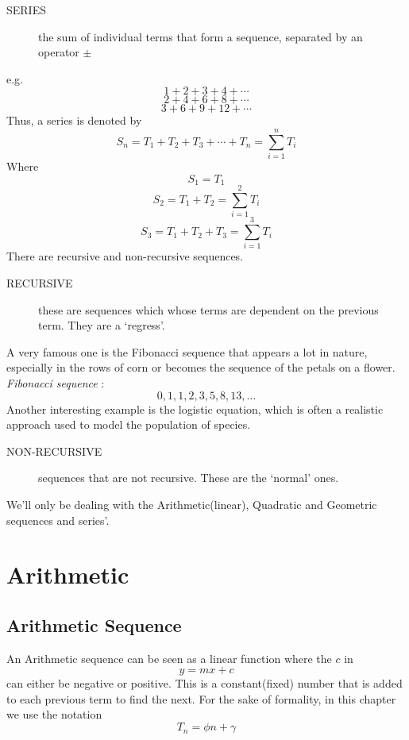 \documentclass[
  letterpaper,
  DIV=11,
  numbers=noendperiod]{scrreprt}
\begin{document}
\begin{description}
\item[SERIES]
the sum of individual terms that form a sequence, separated by an
operator \(\pm\)
\end{description}

e.g.~\[1 + 2 +3+4+⋯ \] \[2 +4+6+8+⋯ \] \[3 +6+9+12+⋯ \] Thus, a series
is denoted by \[
S_n = 𝑇_1 +𝑇_2+𝑇_3+⋯+𝑇_𝑛 = \sum_{i=1}^{n}T_i
\] Where \[
 S_1 = 𝑇_1 
\] \[
 𝑆_2 = 𝑇_1 +T_2 = \sum_{i=1}^{2} T_𝑖
\] \[
 𝑆_3 = 𝑇_1 +T_2 +T_3 = \sum_{i=1}^{3} T_𝑖
\] There are recursive and non-recursive sequences.

\begin{description}
\item[RECURSIVE]
these are sequences which whose terms are dependent on the previous
term. They are a `regress'.
\end{description}

A very famous one is the Fibonacci sequence that appears a lot in
nature, especially in the rows of corn or becomes the sequence of the
petals on a flower. \emph{Fibonacci sequence} : \[0,1,1,2,3,5,8,13,… \]
Another interesting example is the logistic equation, which is often a
realistic approach used to model the population of species.

\begin{description}
\item[NON-RECURSIVE]
sequences that are not recursive. These are the `normal' ones.
\end{description}

We'll only be dealing with the Arithmetic(linear), Quadratic and
Geometric sequences and series'.

\section*{Arithmetic}\label{arithmetic}


\subsection{Arithmetic Sequence}\label{arithmetic-sequence}

An Arithmetic sequence can be seen as a linear function where the \(c\)
in \[y = mx+c \] can either be negative or positive. This is a
constant(fixed) number that is added to each previous term to find the
next. For the sake of formality, in this chapter we use the notation \[
T_n = 𝜙𝑛+𝛾                         
\]
\end{document}
